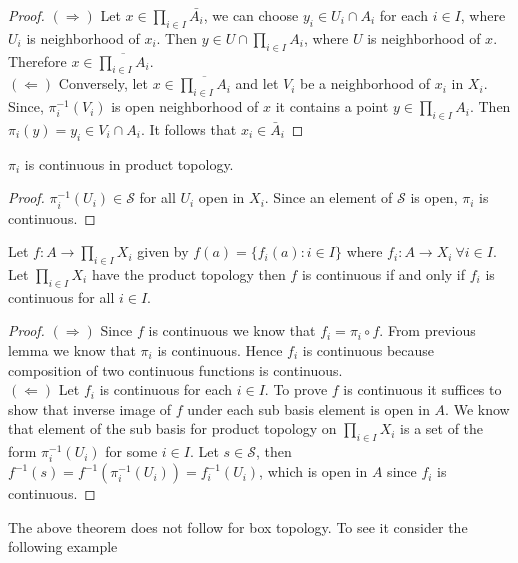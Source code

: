 \documentclass[a4paper,english,12pt]{article}   	%
\begin{document}
\begin{proof}
$(\Rightarrow)$ Let $x \in \prod_{i \in I} \bar{A_{i}}$, we can choose $y_{i} \in U_{i} \cap A_{i}$ for each $i \in I$, where $U_{i}$ is neighborhood of $x_{i}$. Then $y \in U \cap \prod_{i \in I} A_{i}$, where $U$ is neighborhood of $x$. Therefore $x \in \overline{\prod_{i \in I} A_{i}}$.\\
$(\Leftarrow)$ Conversely, let $x \in \overline{\prod_{i \in I} A_{i}}$ and let $V_{i}$ be a neighborhood of $x_{i}$  in $X_{i}$. Since, $\pi_{i}^{-1} (V_{i})$ is open neighborhood of $x$ it contains a point $y \in \prod_{i \in I} A_{i}$. Then $\pi_{i} (y) = y_{i} \in V_{i} \cap A_{i}$. It follows that $x_{i} \in \bar{A}_{i}$ 
\end{proof}
\begin{lem}
$\pi_{i}$ is continuous in product topology.
\end{lem}
\begin{proof}
$\pi_{i}^{-1} (U_{i}) \in \mathcal{S}$ for all $U_{i}$ open in $X_{i}$. Since an element of $\mathcal{S}$ is open, $\pi_{i}$ is continuous.
\end{proof}
\begin{thm}
Let $f \colon A \to \prod_{i \in I} X_{i}$ given by $f(a) = \{ f_{i}(a) \colon i \in I \}$ where $f_{i} \colon A \to X_{i} ~ \forall i \in I$. Let $\prod_{i \in I} X_{i}$ have the product topology then $f$ is continuous if and only if $f_{i}$ is continuous for all $i \in I$. 
\end{thm}
\begin{proof}
$(\Rightarrow)$ Since $f$ is continuous we know that $f_{i} = \pi_{i} \circ f$. From previous lemma we know that $\pi_{i}$ is continuous. Hence $f_{i}$ is continuous because composition of two continuous functions is continuous.\\
$(\Leftarrow)$ Let $f_{i}$ is continuous for each $i \in I$. To prove $f$ is continuous it suffices to show that inverse image of $f$ under each sub basis element is open in $A$. We know that element of the sub basis for product topology on $\prod_{i \in I} X_{i}$ is a set of the form $\pi_{i}^{-1} (U_{i})$ for some $i \in I$.  Let $s \in \mathcal{S}$, then $f^{-1}(s) = f^{-1}(\pi_{i}^{-1}(U_{i})) = f_{i}^{-1}(U_{i})$, which is open in $A$ since $f_{i}$ is continuous. 
\end{proof} 
The above theorem does not follow for box topology. To see it consider   the following example  
\end{document}

